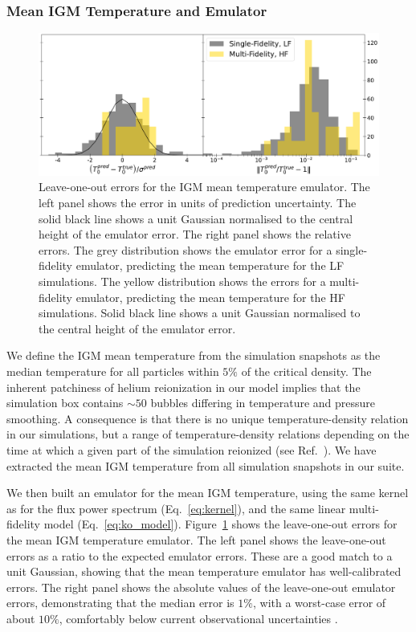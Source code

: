 \documentclass[a4paper,11pt]{article}
\begin{document}

\subsubsection{Mean IGM Temperature and Emulator}

\begin{figure}
    \centering
    \includegraphics[width=\textwidth]{figures/t0emu_errors.pdf}
    \caption{\label{fig:t0_error}
    Leave-one-out errors for the IGM mean temperature emulator.
    The left panel shows the error in units of prediction uncertainty. The solid black line shows a unit Gaussian normalised to the central height of the emulator error. The right panel shows the relative errors.
    The grey distribution shows the emulator error for a single-fidelity emulator, predicting the mean temperature for the LF simulations.
    The yellow distribution shows the errors for a multi-fidelity emulator, predicting the mean temperature for the HF simulations. Solid black line shows a unit Gaussian normalised to the central height of the emulator error.
    }
\end{figure}

We define the IGM mean temperature from the simulation snapshots as the median temperature for all particles within $5\%$ of the critical density.
The inherent patchiness of helium reionization in our model implies that the simulation box contains $\sim 50$ bubbles differing in temperature and pressure smoothing. A consequence is that there is no unique temperature-density relation in our simulations, but a range of temperature-density relations depending on the time at which a given part of the simulation reionized (see Ref.~\cite{UptonSanderbeck:2020}). We have extracted the mean IGM temperature from all simulation snapshots in our suite.

We then built an emulator for the mean IGM temperature, using the same kernel as for the flux power spectrum (Eq.~\ref{eq:kernel}), and the same linear multi-fidelity model (Eq.~\ref{eq:ko_model}). Figure~\ref{fig:t0_error} shows the leave-one-out errors for the mean IGM temperature emulator. The left panel shows the leave-one-out errors as a ratio to the expected emulator errors. These are a good match to a unit Gaussian, showing that the mean temperature emulator has well-calibrated errors. The right panel shows the absolute values of the leave-one-out emulator errors, demonstrating that the median error is $1\%$, with a worst-case error of about $10\%$, comfortably below current observational uncertainties \cite{Gaikwad:2020}.
\end{document}
